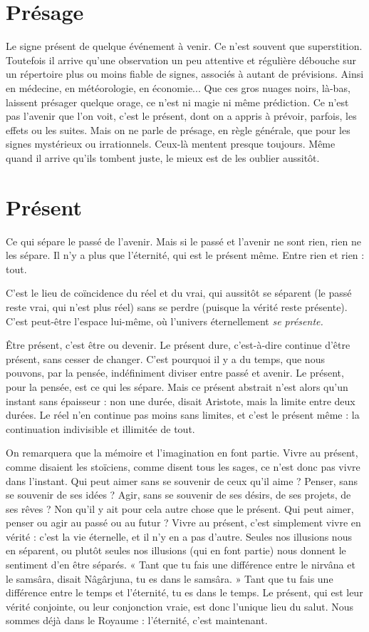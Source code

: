 \section{Présage}
Le signe présent de quelque événement à venir. Ce n’est souvent
que superstition. Toutefois il arrive qu’une observation un peu
attentive et régulière débouche sur un répertoire plus ou moins fiable de signes,
associés à autant de prévisions. Ainsi en médecine, en météorologie, en économie...
Que ces gros nuages noirs, là-bas, laissent présager quelque orage, ce
n’est ni magie ni même prédiction. Ce n’est pas l’avenir que l’on voit, c’est le
présent, dont on a appris à prévoir, parfois, les effets ou les suites. Mais on ne
parle de présage, en règle générale, que pour les signes mystérieux ou irrationnels.
Ceux-là mentent presque toujours. Même quand il arrive qu’ils tombent
juste, le mieux est de les oublier aussitôt.

\section{Présent}
Ce qui sépare le passé de l’avenir. Mais si le passé et l’avenir ne
sont rien, rien ne les sépare. Il n’y a plus que l'éternité, qui est le
présent même. Entre rien et rien : tout.

C’est le lieu de coïncidence du réel et du vrai, qui aussitôt se séparent (le
passé reste vrai, qui n'est plus réel) sans se perdre (puisque la vérité reste présente).
C’est peut-être l’espace lui-même, où l'univers éternellement {\it se présente.}

Être présent, c’est être ou devenir. Le présent dure, c’est-à-dire continue
d’être présent, sans cesser de changer. C’est pourquoi il y a du temps, que nous
pouvons, par la pensée, indéfiniment diviser entre passé et avenir. Le présent,
pour la pensée, est ce qui les sépare. Mais ce présent abstrait n’est alors qu’un
instant sans épaisseur : non une durée, disait Aristote, mais la limite entre deux
durées. Le réel n’en continue pas moins sans limites, et c’est le présent même :
la continuation indivisible et illimitée de tout.

On remarquera que la mémoire et l’imagination en font partie. Vivre au
présent, comme disaient les stoïciens, comme disent tous les sages, ce n’est
donc pas vivre dans l'instant. Qui peut aimer sans se souvenir de ceux qu'il
aime ? Penser, sans se souvenir de ses idées ? Agir, sans se souvenir de ses désirs,
de ses projets, de ses rêves ? Non qu’il y ait pour cela autre chose que le présent.
Qui peut aimer, penser ou agir au passé ou au futur ? Vivre au présent, c’est
simplement vivre en vérité : c’est la vie éternelle, et il n’y en a pas d’autre.
Seules nos illusions nous en séparent, ou plutôt seules nos illusions (qui en font
partie) nous donnent le sentiment d’en être séparés. « Tant que tu fais une différence
entre le nirvâna et le samsâra, disait Nâgârjuna, tu es dans le samsâra. »
Tant que tu fais une différence entre le temps et l'éternité, tu es dans le temps.
Le présent, qui est leur vérité conjointe, ou leur conjonction vraie, est donc
l'unique lieu du salut. Nous sommes déjà dans le Royaume : l'éternité, c’est
maintenant.

